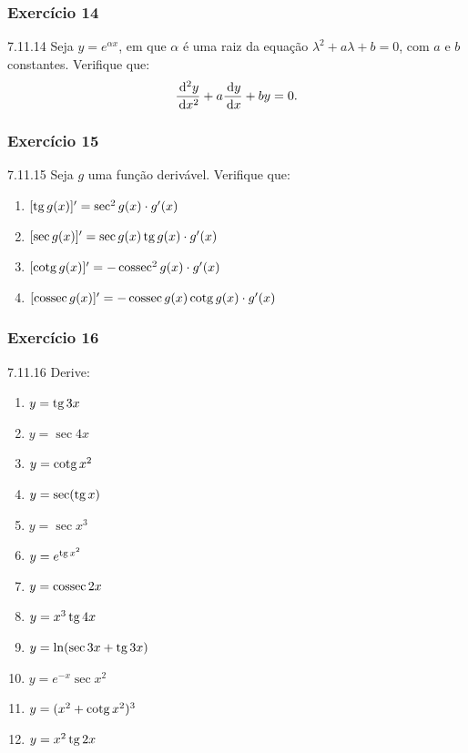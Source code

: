 \subsubsection*{Exercício 14}
\begin{exercicio}[14]{7.11.14}
Seja $y = e^{\alpha x}$, em que $\alpha$ é uma raiz da equação $\lambda^2 + a\lambda + b = 0$, com $a$ e $b$ constantes. Verifique que:
\[
\frac{\,\mathrm{d}^2 y}{\,\mathrm{d} x^2} + a\frac{\,\mathrm{d} y}{\,\mathrm{d} x} + by = 0.
\]
\end{exercicio}

\subsubsection*{Exercício 15}
\begin{exercicio}[15]{7.11.15}
Seja $g$ uma função derivável. Verifique que:
\begin{enumerate}[label=\alph*)]
    \item $[\operatorname{tg} g(x)]' = \sec^2 g(x) \cdot g'(x)$
    \item $[\sec g(x)]' = \sec g(x)\operatorname{tg} g(x) \cdot g'(x)$
    \item $[\operatorname{cotg} g(x)]' = -\operatorname{cossec}^2 g(x) \cdot g'(x)$
    \item $[\operatorname{cossec} g(x)]' = -\operatorname{cossec} g(x)\operatorname{cotg} g(x) \cdot g'(x)$
\end{enumerate}
\end{exercicio}

\subsubsection*{Exercício 16}
\begin{exercicio}[16]{7.11.16}
Derive:
\begin{enumerate}[label=\alph*)]
    \item $y = \operatorname{tg} 3x$
    \item $y = \sec 4x$
    \item $y = \operatorname{cotg} x^2$
    \item $y = \sec(\operatorname{tg} x)$
    \item $y = \sec x^3$
    \item $y = e^{\operatorname{tg} x^2}$
    \item $y = \operatorname{cossec} 2x$
    \item $y = x^3 \operatorname{tg} 4x$
    \item $y = \ln(\sec 3x + \operatorname{tg} 3x)$
    \item $y = e^{-x}\sec x^2$
    \item $y = (x^2 + \operatorname{cotg} x^2)^3$
    \item $y = x^2 \operatorname{tg} 2x$
\end{enumerate}
\end{exercicio}

